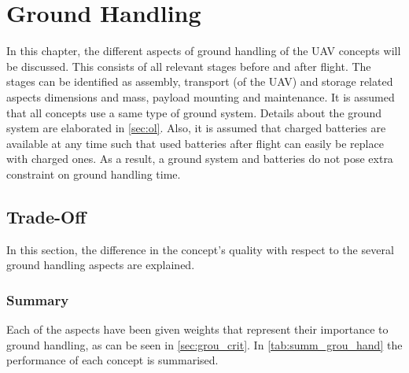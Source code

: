 \chapter{Ground Handling}
\label{ch:grou_hand}

In this chapter, the different aspects of ground handling of the UAV concepts will be discussed. This consists of all relevant stages before and after flight. The stages can be identified as assembly, transport (of the UAV) and storage related aspects dimensions and mass, payload mounting and maintenance. 
It is assumed that all concepts use a same type of ground system. Details about the ground system are elaborated in \autoref{sec:ol}. Also, it is assumed that charged batteries are available at any time such that used batteries after flight can easily be replace with charged ones. As a result, a ground system and batteries do not pose extra constraint on ground handling time. %


\section{Trade-Off}
\label{sec:grou_hand_TO}
In this section, the difference in the concept's quality with respect to the several ground handling aspects are explained.

\subsection{Summary}
Each of the aspects have been given weights that represent their importance to ground handling, as can be seen in \autoref{sec:grou_crit}. In \autoref{tab:summ_grou_hand} the performance of each concept is summarised. 



